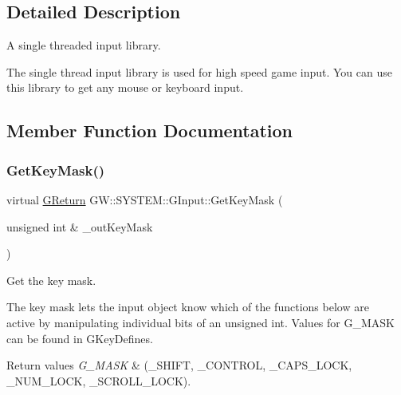 \subsection{Detailed Description}
A single threaded input library. 

The single thread input library is used for high speed game input. You can use this library to get any mouse or keyboard input. 

\subsection{Member Function Documentation}
\mbox{\label{classGW_1_1SYSTEM_1_1GInput_a448ee14346a393286b0dfe1dc61ca93d}} 
\subsubsection{\texorpdfstring{Get\+Key\+Mask()}{GetKeyMask()}}
{\footnotesize\ttfamily virtual \mbox{\hyperlink{namespaceGW_a67a839e3df7ea8a5c5686613a7a3de21}{G\+Return}} G\+W\+::\+S\+Y\+S\+T\+E\+M\+::\+G\+Input\+::\+Get\+Key\+Mask (\begin{DoxyParamCaption}\item[{unsigned int \&}]{\+\_\+out\+Key\+Mask }\end{DoxyParamCaption})\hspace{0.3cm}{\ttfamily [pure virtual]}}



Get the key mask. 

The key mask lets the input object know which of the functions below are ~\newline
active by manipulating individual bits of an unsigned int. Values for G\+\_\+\+M\+A\+SK can be found in G\+Key\+Defines.


\begin{DoxyRetVals}{Return values}
{\em G\+\_\+\+M\+A\+SK} & (\+\_\+\+S\+H\+I\+FT, \+\_\+\+C\+O\+N\+T\+R\+OL, \+\_\+\+C\+A\+P\+S\+\_\+\+L\+O\+CK, \+\_\+\+N\+U\+M\+\_\+\+L\+O\+CK, \+\_\+\+S\+C\+R\+O\+L\+L\+\_\+\+L\+O\+CK). \\
\hline
\end{DoxyRetVals}
\mbox{\label{classGW_1_1SYSTEM_1_1GInput_a775fca7ad71371f369e3ad69fb32603a}} 
